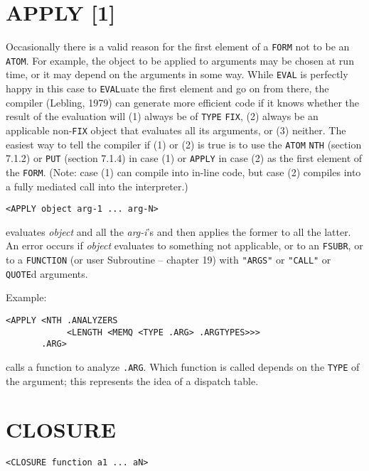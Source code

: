 \documentclass[a4paper]{scrbook}
\begin{document}
\section{APPLY {[}1{]}}\label{apply-1}

Occasionally there is a valid reason for the first element of a \texttt{FORM} not to be an \texttt{ATOM}. For example, the
object to be applied to arguments may be chosen at run time, or it may depend on the arguments in some way. While
\texttt{EVAL} is perfectly happy in this case to \texttt{EVAL}uate the first element and go on from there, the compiler
(Lebling, 1979) can generate more efficient code if it knows whether the result of the evaluation will (1) always be of
\texttt{TYPE} \texttt{FIX}, (2) always be an applicable non-\texttt{FIX} object that evaluates all its arguments, or (3)
neither. The easiest way to tell the compiler if (1) or (2) is true is to use the \texttt{ATOM}
\texttt{NTH} (section 7.1.2) or \texttt{PUT} (section 7.1.4) in case (1) or
\texttt{APPLY} in case (2) as the first element of the \texttt{FORM}. (Note: case (1) can compile into in-line code, but
case (2) compiles into a fully mediated call into the interpreter.)

\begin{verbatim}
<APPLY object arg-1 ... arg-N>
\end{verbatim}

 evaluates \emph{object} and all the \emph{arg-i}'s and then applies the former to all the
latter. An error occurs if \emph{object} evaluates to something not applicable, or to an \texttt{FSUBR}, or to a
\texttt{FUNCTION} (or user Subroutine -- chapter 19) with \texttt{"ARGS"} or \texttt{"CALL"} or \texttt{QUOTE}d arguments.

Example:

\begin{verbatim}
<APPLY <NTH .ANALYZERS
            <LENGTH <MEMQ <TYPE .ARG> .ARGTYPES>>>
       .ARG>
\end{verbatim}

calls a function to analyze \texttt{.ARG}. Which function is called depends on the \texttt{TYPE} of the argument; this
represents the idea of a dispatch table.

\section{CLOSURE}\label{closure}

\begin{verbatim}
<CLOSURE function a1 ... aN>
\end{verbatim}
\end{document}

